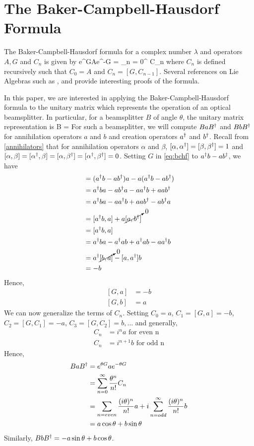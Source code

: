 \chapter{The Baker-Campbell-Hausdorf Formula\label{ch:bchf}}
The Baker-Campbell-Hausdorf formula for a complex number $\lambda$ and operators $A,G$ and $C_n$ is given by
\beq
\label{eq:bchf}
e^{\lambda G}Ae^{-\lambda G} = \sum\limits_{n = 0}^\infty {} C_n
\eeq
where $C_n$ is defined recursively such that $C_0 = A$ and $C_n = [G,C_{n-1}]$. Several references on Lie Algebras such as \cite{liealgs}, \cite{liealgs2} and \cite{liealgs3} provide interesting proofs of the formula.

In this paper, we are interested in applying the Baker-Campbell-Hausdorf formula to the unitary matrix which represents the operation of an optical beamsplitter. In particular, for a beamsplitter $B$ of angle $\theta$, the unitary matrix representation is
\beq
\label{eq:bseq}
B = 
\eeq
For such a beamsplitter, we will compute $BaB^\dagger$ and $BbB^\dagger$ for annihilation operators $a$ and $b$ and creation operators $a^\dagger$ and $b^\dagger$. Recall from \ref{annihilators} that for annihilation operators $\alpha$ and $\beta$, $[\alpha,\alpha^\dagger] = [\beta,\beta^\dagger] = 1$ and $[\alpha,\beta] = [\alpha^\dagger,\beta] = [\alpha,\beta^\dagger] = [\alpha^\dagger,\beta^\dagger] = 0$. 
Setting $G$ in \eqref{eq:bchf} to $a^\dagger b - ab^\dagger$, we have
\begin{align*}
[G,a] &= (\adj{a} b - a\adj{b})a - a(\adj{a} b - a\adj{b}) \\
&= \adj{a}ba - a\adj{b}a - a\adj{a}b + aa\adj{b}\\
&= \adj{a}ba - a\adj{a}b + aa\adj{b} - a\adj{b}a\\
&= [\adj{a}b,a] + a\cancelto{0}{[a,\adj{b}]}\\
&= [\adj{a}b,a]\\
&= \adj{a}ba - \adj{a}ab + \adj{a}ab - a\adj{a}b\\
&= \adj{a}\cancelto{0}{[b,a]} - [a,\adj{a}]b\\
&= -b
\end{align*}
Hence, 
\begin{align}
\label{eq:Gcommutes}
[G,a] &= -b\\
[G,b] &= a
\end{align}
We can now generalize the terms of $C_n$. Setting $C_0 = a$, $C_1 = [G,a] = -b$, $C_2 = [G,C_1] = -a$, $C_3 = [G,C_2] = b,\ldots$ and generally,
\begin{align*}
C_n &= i^na \text{ for even n}\\
C_n &= i^{n+1}b \text{ for odd n}
\end{align*}
Hence,
\begin{align*}
BaB^\dagger &= e^{\theta G}ae^{-\theta G}\\
&= \sum\limits_{n=0}^\infty \frac{\theta^n}{n!}C_n\\
&= \sum\limits_{n = even} \frac{(i\theta)^n}{n!}a + i\sum\limits_{n = odd}^\infty \frac{(i\theta)^n}{n!}b\\
&= a\cos\theta + b\sin\theta
\end{align*}
Similarly, $BbB^\dagger = -a\sin\theta + b\cos\theta$.

